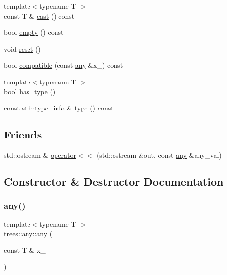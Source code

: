 \begin{DoxyCompactItemize}
\item 
{\footnotesize template$<$typename T $>$ }\\const T \& \hyperlink{classtrees_1_1any_a63088b3ff9a449b7c5ec82e635aa5b8d}{cast} () const
\item 
bool \hyperlink{classtrees_1_1any_a2bc0c0f86ee6baefd7d9efebad0fdada}{empty} () const
\item 
void \hyperlink{classtrees_1_1any_ad34b59c202e4c39dc229fe171589ad8a}{reset} ()
\item 
bool \hyperlink{classtrees_1_1any_a1ea0044905276054696cd2c68988c221}{compatible} (const \hyperlink{classtrees_1_1any}{any} \&x\+\_\+) const
\item 
{\footnotesize template$<$typename T $>$ }\\bool \hyperlink{classtrees_1_1any_af176250c5b4a965705c28b3fe4d150ad}{has\+\_\+type} ()
\item 
const std\+::type\+\_\+info \& \hyperlink{classtrees_1_1any_a12c9cf25286af6afcb4891d8bbd5b2fa}{type} () const
\end{DoxyCompactItemize}
\subsection*{Friends}
\begin{DoxyCompactItemize}
\item 
std\+::ostream \& \hyperlink{classtrees_1_1any_a2987b17b8a128cbefb105ed12f5b8f92}{operator$<$$<$} (std\+::ostream \&out, const \hyperlink{classtrees_1_1any}{any} \&any\+\_\+val)
\end{DoxyCompactItemize}


\subsection{Constructor \& Destructor Documentation}
\mbox{\label{classtrees_1_1any_aff96b0dcecc2856f268f4da58b0e6e8c}} 
\subsubsection{\texorpdfstring{any()}{any()}\hspace{0.1cm}{\footnotesize\ttfamily [1/4]}}
{\footnotesize\ttfamily template$<$typename T $>$ \\
trees\+::any\+::any (\begin{DoxyParamCaption}\item[{const T \&}]{x\+\_\+ }\end{DoxyParamCaption})\hspace{0.3cm}{\ttfamily [inline]}}

